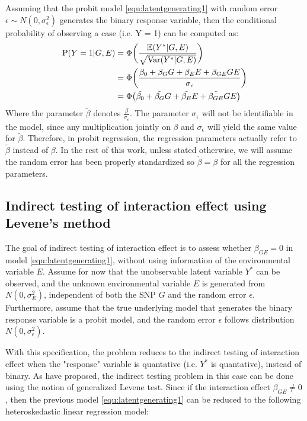 Assuming that the probit model \ref{equ:latentgenerating1} with random error $\epsilon \sim N(0,\sigma_\epsilon^2)$ generates the binary response variable, then the conditional probability of observing a case (i.e. Y = 1) can be computed as:
\begin{equation}\label{equ:computationOfProb}
\begin{aligned}
\text{P}(Y=1|G,E) &= \Phi\bigg(\frac{\mathbb{E}(Y^*|G,E)}{\sqrt{\text{Var}(Y^*|G,E)}}\bigg)\\
                  &= \Phi\bigg(\frac{\beta_0+\beta_GG+\beta_EE + \beta_{GE}GE}{\sigma_\epsilon}\bigg)\\
                  &= \Phi\big(\tilde{\beta_0}+\tilde{\beta_G}G+\tilde{\beta_E}E + \tilde{\beta_{GE}}GE\big)
\end{aligned}
\end{equation}
Where the parameter $\tilde{\beta}$ denotes $\frac{\beta}{\sigma_\epsilon}$. The parameter $\sigma_\epsilon$ will not be identifiable in the model, since any multiplication jointly on $\beta$ and $\sigma_\epsilon$ will yield the same value for $\tilde{\beta}$. Therefore, in probit regression, the regression parameters actually refer to $\tilde{\beta}$ instead of $\beta$. In the rest of this work, unless stated otherwise, we will assume the random error has been properly standardized so $\tilde{\beta} = \beta$ for all the regression parameters.


\subsection{Indirect testing of interaction effect using Levene's method}

The goal of indirect testing of interaction effect is to assess whether $\beta_{GE} = 0$ in model \ref{equ:latentgenerating1}, without using information of the environmental variable $E$. Assume for now that the unobservable latent variable $Y^*$ can be observed, and the unknown environmental variable $E$ is generated from $N(0,\sigma_E^2)$, independent of both the SNP $G$ and the random error $\epsilon$. Furthermore, assume that the true underlying model that generates the binary response variable is a probit model, and the random error $\epsilon$ follows distribution $N(0,\sigma_\epsilon^2)$. 


With this specification, the problem reduces to the indirect testing of interaction effect when the "response" variable is quantative (i.e. $Y^*$ is quantative), instead of binary. As \citet{gjlst} have proposed, the indirect testing problem in this case can be done using the notion of generalized Levene test. Since if the interaction effect $\beta_{GE} \neq 0$, then the previous model \ref{equ:latentgenerating1} can be reduced to the following heteroskedastic linear regression model:


